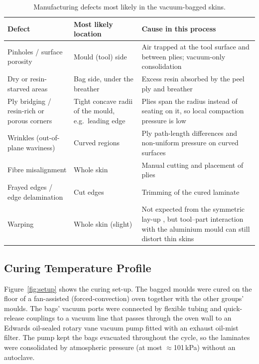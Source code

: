 \begin{table}[htbp]
    \addedfloat
    \centering
    \caption{Manufacturing defects most likely in the vacuum-bagged
    skins.}
    \label{tab:defects}
    \footnotesize
    \renewcommand{\arraystretch}{1.12}
    \begin{tabularx}{\linewidth}{@{}>{\raggedright\arraybackslash}p{3.7cm}>{\raggedright\arraybackslash}p{4.2cm}L@{}}
        \toprule
        \textbf{Defect} & \textbf{Most likely location} & \textbf{Cause in this process} \\
        \midrule
        Pinholes / surface porosity & Mould (tool) side & Air trapped at the tool surface and between plies; vacuum-only consolidation \citep{hamill2015,centea2015,mehdikhani2019} \\
        Dry or resin-starved areas & Bag side, under the breather & Excess resin absorbed by the peel ply and breather \citep{sengodan2013,hexcel2013} \\
        Ply bridging / resin-rich or porous corners & Tight concave radii of the mould, e.g.\ leading edge & Plies span the radius instead of seating on it, so local compaction pressure is low \citep{levy2014} \\
        Wrinkles (out-of-plane waviness) & Curved regions & Ply path-length differences and non-uniform pressure on curved surfaces \citep{thor2020,elkington2015} \\
        Fibre misalignment & Whole skin & Manual cutting and placement of plies \citep{elkington2015,potter2008} \\
        Frayed edges / edge delamination & Cut edges & Trimming of the cured laminate \citep{teti2002} \\
        Warping & Whole skin (slight) & Not expected from the symmetric lay-up \citep{mallick2007}, but tool--part interaction with the aluminium mould can still distort thin skins \citep{twigg2004,kappel2016} \\
        \bottomrule
    \end{tabularx}
\end{table}

\begin{addedblock}
\subsection{Curing Temperature Profile}

Figure~\ref{fig:setup} shows the curing set-up. The bagged moulds were
cured on the floor of a fan-assisted (forced-convection) oven together
with the other groups' moulds. The bags' vacuum ports were connected
by flexible tubing and quick-release couplings to a vacuum line that
passes through the oven wall to an Edwards oil-sealed rotary vane
vacuum pump fitted with an exhaust oil-mist filter. The pump kept the
bags evacuated throughout the cycle, so the laminates were
consolidated by atmospheric pressure (at most $\approx$101\,kPa)
without an autoclave.
\end{addedblock}

